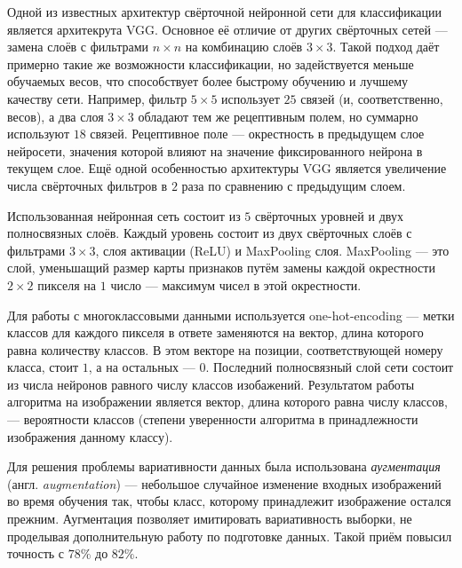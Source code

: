 Одной из известных архитектур свёрточной нейронной сети для классификации
является архитекрута VGG. Основное её отличие от других свёрточных сетей ---
замена слоёв с фильтрами $n \times n$ на комбинацию слоёв $3 \times 3$. Такой
подход даёт примерно такие же возможности классификации, но задействуется меньше
обучаемых весов, что способствует более быстрому обучению и лучшему качеству
сети. Например, фильтр $5 \times 5$ использует $25$ связей (и, соответственно,
весов), а два слоя $3 \times 3$ обладают тем же рецептивным полем, но суммарно
используют $18$ связей.
Рецептивное поле --- окрестность в предыдущем слое
нейросети, значения которой влияют на значение фиксированного нейрона в текущем
слое.  Ещё одной особенностью архитектуры VGG является увеличение числа
свёрточных фильтров в $2$ раза по сравнению с предыдущим слоем.

Использованная нейронная сеть состоит из $5$ свёрточных уровней и двух
полносвязных слоёв. Каждый уровень состоит из двух свёрточных слоёв с фильтрами
$3 \times 3$, слоя активации (ReLU) и MaxPooling слоя. MaxPooling --- это слой,
уменьшащий размер карты признаков путём замены каждой окрестности $2 \times 2$
пикселя на $1$ число --- максимум чисел в этой окрестности.

Для работы с многоклассовыми данными используется one-hot-encoding --- метки
классов для каждого пикселя в ответе заменяются на вектор, длина которого
равна количеству классов. В этом векторе на позиции, соответствующей номеру
класса, стоит $1$, а на остальных --- $0$. Последний полносвязный слой сети
состоит из числа нейронов равного числу классов изобажений. Результатом работы
алгоритма на изображении является вектор, длина которого равна числу классов,
--- вероятности классов (степени уверенности алгоритма в принадлежности
изображения данному классу). 

Для решения проблемы вариативности данных была использована \textit{аугментация}
(англ.  \textit{augmentation}) --- небольшое случайное изменение входных
изображений во время обучения так, чтобы класс, которому принадлежит изображение
остался прежним. Аугментация позволяет имитировать вариативность выборки, не
проделывая дополнительную работу по подготовке данных. Такой приём повысил
точность с $78\%$ до $82\%$.
